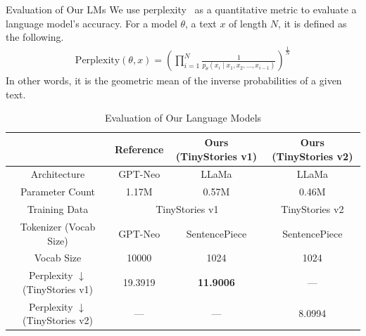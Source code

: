 \documentclass{beamer}
\begin{document}
\begin{frame}{Evaluation of Our LMs}
We use perplexity~\cite{jelinekPerplexityMeasureDifficulty1977} as a quantitative metric to evaluate a language model's accuracy. For a model $\theta$, a text $x$ of length $N$, it is defined as the following.
\begin{align}
    \text{Perplexity}(\theta, x) = \left( \prod_{i=1}^N \frac{1}{p_\theta(x_i\mid x_1, x_2, \dots, x_{i-1})} \right)^{\frac1N}
\end{align}
In other words, it is the geometric mean of the inverse probabilities of a given text.
\begin{table}
\centering
\caption{Evaluation of Our Language Models}
\label{tab:our_models_eval} \tiny
\begin{tabular}{|c|cc|c|}
\hline
                                       & \multicolumn{1}{c|}{Reference}        & Ours (TinyStories v1) & Ours (TinyStories v2) \\ \hline
Architecture                           & \multicolumn{1}{c|}{GPT-Neo}          & LLaMa                 & LLaMa                 \\ \hline
Parameter Count                          & \multicolumn{1}{c|}{1.17M}            & 0.57M                 & 0.46M                 \\ \hline
Training Data                                   & \multicolumn{2}{c|}{TinyStories v1}                  & TinyStories v2        \\ \hline
Tokenizer (Vocab Size)                 & \multicolumn{1}{c|}{GPT-Neo}          & SentencePiece                & SentencePiece                \\ \hline
Vocab Size                             & \multicolumn{1}{c|}{10000}            & 1024                  & 1024                  \\ \hline
Perplexity $\downarrow$ (TinyStories v1) & \multicolumn{1}{c|}{19.3919} & \textbf{11.9006}      & ---                   \\ \hline
Perplexity $\downarrow$ (TinyStories v2)& \multicolumn{1}{c|}{---}              & ---                   & 8.0994                \\ \hline
\end{tabular}
\end{table}
\end{frame}
\end{document}

